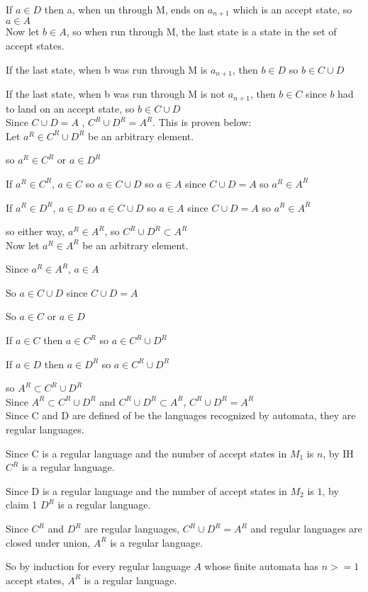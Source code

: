 \documentclass[letterpaper, 11pt]{article}
\begin{document}
If $a \in D$ then a, when un through M, ends on $a_{n+1}$ which is an accept state, so $a \in A$\\

Now let $b \in A$, so when run through M, the last state is a state in the set of accept states.

If the last state, when b was run through M is $a_{n+1}$, then $b \in D$ so $b \in C \cup D$

If the last state, when b was run through M is not $a_{n+1}$, then $b \in C$ since $b$ had to land on an accept state, so $b \in C \cup D$ \\

Since $C \cup D = A$ , $C^R \cup D^R = A^R$.
This is proven below:\\

Let $a^R \in C^R \cup D^R$ be an arbitrary element.

so $a^R \in C^R$ or $a \in D^R$

If $a^R \in C^R$, $a \in C$ 
so $a \in C \cup D$ 
so $a \in A$ since $C \cup D = A$
so $a^R \in A^R$

If $a^R \in D^R$, $a \in D$ 
so $a \in C \cup D$ 
so $a \in A$  since $C \cup D = A$
so $a^R \in A^R$

so either way, $a^R \in A^R$, so $C^R \cup D^R \subset A^R$\\

Now let $a^R \in A^R$ be an arbitrary element.

Since $a^R \in A^R$, $a \in A$

So $a \in C \cup D$ since $C \cup D = A$

So $a \in C$ or $a \in D$

If $a \in C$ then $a \in C^R$
so $a \in C^R \cup D^R$

If $a \in D$ then $a \in D^R$
so $a \in C^R \cup D^R$

so $A^R \subset C^R \cup D^R$\\

Since $A^R \subset C^R \cup D^R$ and $C^R \cup D^R \subset A^R$, $C^R \cup D^R = A^R$\\

Since C and D are defined of be the languages recognized by automata, they are regular languages.

Since C is a regular language and the number of accept states in $M_1$ is $n$, by IH $C^R$ is a regular language.

Since D is a regular language and the number of accept states in $M_2$ is $1$, by claim 1 $D^R$ is a regular language.

Since $C^R$ and $D^R$ are regular languages, $C^R \cup D^R = A^R$ and regular languages are closed under union, $A^R$ is a regular language.

So by induction for every regular language $A$ whose finite automata has $n >= 1$ accept states, $A^R$ is a regular language.
\end{document}
